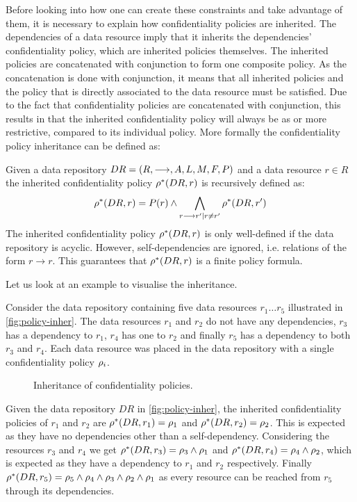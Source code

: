 Before looking into how one can create these constraints and take advantage of them, it is necessary to explain how confidentiality policies are inherited. The dependencies of a data resource imply that it inherits the dependencies' confidentiality policy, which are inherited policies themselves. The inherited policies are concatenated with conjunction to form one composite policy. As the concatenation is done with conjunction, it means that all inherited policies and the policy that is directly associated to the data resource must be satisfied. Due to the fact that confidentiality policies are concatenated with conjunction, this results in that the inherited confidentiality policy will always be as or more restrictive, compared to its individual policy. More formally the confidentiality policy inheritance can be defined as:
\begin{definition}\label{def:cpi}
Given a data repository $DR= \left( R, \longrightarrow, A, L, M, F, P \right)$ and a data resource $r \in R$ the inherited confidentiality policy $\rho^{\ast}(DR, r)$ is recursively defined as:
\begin{equation*}
    \rho^{\ast}(DR, r) = P(r) \land \bigwedge\limits_{r \longrightarrow r' \mid r \neq r'} \rho^{\ast}(DR, r')
\end{equation*}
The inherited confidentiality policy $\rho^{\ast}(DR, r)$ is only well-defined if the data repository is acyclic. However, self-dependencies are ignored, i.e. relations of the form $r \longrightarrow r$. This guarantees that $\rho^{\ast}(DR, r)$ is a finite policy formula.
\end{definition}

Let us look at an example to visualise the inheritance.
\begin{example}
Consider the data repository containing five data resources $r_1\ldots r_5$ illustrated in \autoref{fig:policy-inher}. The data resources $r_1$ and $r_2$ do not have any dependencies, $r_3$ has a dependency to $r_1$, $r_4$ has one to $r_2$ and finally $r_5$ has a dependency to both $r_3$ and $r_4$. Each data resource was placed in the data repository with a single confidentiality policy $\rho_i$.
\begin{figure}[!ht]
    \begin{center}
        
        \caption{Inheritance of confidentiality policies.}
        \label{fig:policy-inher}
    \end{center}
\end{figure}
Given the data repository $DR$ in \autoref{fig:policy-inher}, the inherited confidentiality policies of $r_1$ and $r_2$ are $\rho^{\ast}(DR, r_1) = \rho_1$ and $\rho^{\ast}(DR, r_2) = \rho_2$. This is expected as they have no dependencies other than a self-dependency. Considering the resources $r_3$ and $r_4$ we get $\rho^{\ast}(DR, r_3) = \rho_3 \land \rho_1$ and $\rho^{\ast}(DR, r_4) = \rho_4 \land \rho_2$, which is expected as they have a dependency to $r_1$ and $r_2$ respectively. Finally $\rho^{\ast}(DR, r_5) = \rho_5 \land \rho_4 \land \rho_3 \land \rho_2 \land \rho_1$ as every resource can be reached from $r_5$ through its dependencies.
\end{example}

